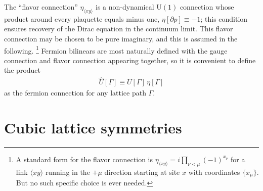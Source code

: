 \documentclass [12pt]{article}
\begin{document}
The ``flavor connection'' $\eta_{\langle xy \rangle}$ is a non-dynamical U$(1)$ connection
whose product around every plaquette equals minus one,
$\eta[\partial p] \equiv -1$;
this condition ensures recovery of the Dirac equation in the continuum limit.
This flavor connection may be chosen to be pure imaginary, and this is assumed
in the following.%
\footnote
    {%
    A standard form for the flavor connection is
    $
	\eta_{\langle xy \rangle} = i \prod_{\nu < \mu} (-1)^{x_\nu}
    $
    for a link $\langle xy \rangle$ running in the $+\mu$ direction
    starting at site $x$ with coordinates $\{ x_\mu \}$.
    But no such specific choice is ever needed.
    }
Fermion bilinears are most naturally defined with
the gauge connection and flavor connection appearing together,
so it is convenient to define the product
\begin{align}
    \hat U[\Gamma] \equiv U[\Gamma] \, \eta[\Gamma]
\label {eq:fermconnection}
\end{align}
as the fermion connection for any lattice path $\Gamma$.

\section  {Cubic lattice symmetries}\label{sec:Cubic}
\end{document}
